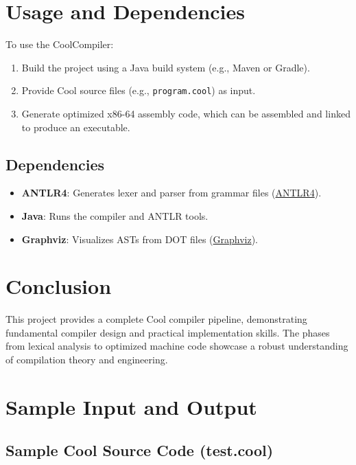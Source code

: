 \documentclass[12pt]{article}
\begin{document}
\section{Usage and Dependencies}
To use the CoolCompiler:
\begin{enumerate}[itemsep=2pt]
    \item Build the project using a Java build system (e.g., Maven or Gradle).
    \item Provide Cool source files (e.g., \texttt{program.cool}) as input.
    \item Generate optimized x86-64 assembly code, which can be assembled and linked to produce an executable.
\end{enumerate}

\subsection{Dependencies}
\begin{itemize}[itemsep=2pt]
    \item \textbf{ANTLR4}: Generates lexer and parser from grammar files (\href{https://www.antlr.org}{ANTLR4}).
    \item \textbf{Java}: Runs the compiler and ANTLR tools.
    \item \textbf{Graphviz}: Visualizes ASTs from DOT files (\href{https://www.graphviz.org}{Graphviz}).
\end{itemize}

\FloatBarrier

\section{Conclusion}
This project provides a complete Cool compiler pipeline, demonstrating fundamental compiler design and practical implementation skills. The phases from lexical analysis to optimized machine code showcase a robust understanding of compilation theory and engineering.


\FloatBarrier
\section{Sample Input and Output}

\subsection{Sample Cool Source Code (test.cool)}
\end{document}

